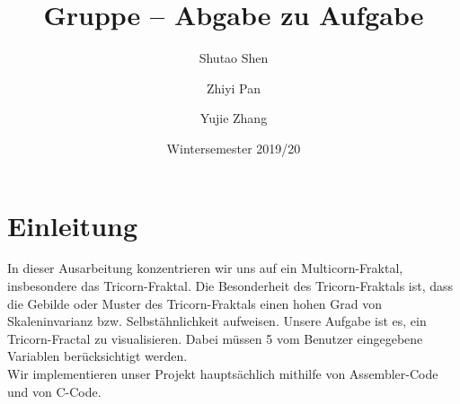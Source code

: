 \documentclass[course=erap]{aspdoc}
\author{Shutao Shen \and Zhiyi Pan \and Yujie Zhang}
\date{Wintersemester 2019/20} %
\title{Gruppe \theGroup{} -- Abgabe zu Aufgabe \theNumber}
\begin{document}
\maketitle

\section{Einleitung}
In dieser Ausarbeitung konzentrieren wir uns auf ein Multicorn-Fraktal, insbesondere das Tricorn-Fraktal. Die Besonderheit des Tricorn-Fraktals ist, dass die Gebilde oder Muster des Tricorn-Fraktals einen hohen Grad von Skaleninvarianz bzw. Selbstähnlichkeit aufweisen.\cite{ wiki:Fraktal} \cite{ wiki:Tricorn} Unsere Aufgabe ist es, ein Tricorn-Fractal zu visualisieren. Dabei müssen 5 vom Benutzer eingegebene Variablen berücksichtigt werden.
\\Wir implementieren unser Projekt hauptsächlich mithilfe von Assembler-Code und von C-Code.
\end{document}
